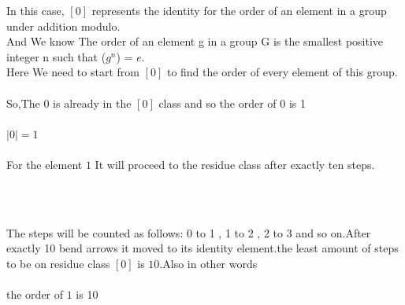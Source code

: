 \documentclass{article}
\begin{document}
In this case, $[0]$ represents the identity for the order of an element in a group under addition modulo.\\
And We know The order of an element g in a group G is the smallest positive integer n
such that ($g^n$) = $e$.\\
Here We need to start from $[0]$ to find the order of every element of this group.\\\\
So,The $0$ is already in the $[0]$ class and so the order of $0$ is 1\\\\
$ |0| = 1 $\\\\
For the element $1$ It will proceed to the residue class after exactly ten steps.\\\
\begin{center}
\\
\end{center}
The steps will be counted as follows: 0 to 1 , 1 to 2 , 2 to 3 and so on.After exactly 10 bend arrows it moved to its identity element.the least amount of steps to be on residue class $[0]$ is $10$.Also in other words \\\\
the order of $1$ is 10\\\\
\end{document}
